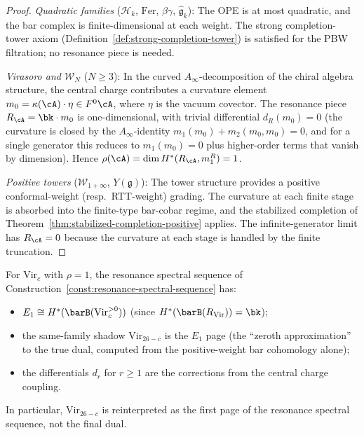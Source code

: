 \begin{proof}
\emph{Quadratic families} ($\mathcal{H}_k$, $\mathrm{Fer}$,
$\beta\gamma$, $\widehat{\mathfrak{g}}_k$):
The OPE is at most quadratic, and the bar complex is
finite-dimensional at each weight.  The strong completion-tower
axiom (Definition~\ref{def:strong-completion-tower}) is
satisfied for the PBW filtration; no resonance piece is needed.

\emph{Virasoro and $\mathcal{W}_N$} ($N \ge 3$):
In the curved $A_\infty$-decomposition of the chiral algebra
structure, the central charge contributes a curvature element
$m_0 = \kappa(\cA) \cdot \eta \in F^0\cA$, where $\eta$ is
the vacuum covector.
The resonance piece $R_\cA = \bk \cdot m_0$ is
one-dimensional, with trivial differential $d_R(m_0) = 0$
(the curvature is closed by the $A_\infty$-identity
$m_1(m_0) + m_2(m_0, m_0) = 0$, and for a single generator
this reduces to $m_1(m_0) = 0$ plus higher-order terms that
vanish by dimension).  Hence $\rho(\cA)
= \dim H^*(R_\cA, m_1^R) = 1$.

\emph{Positive towers} ($\mathcal{W}_{1+\infty}$, $Y(\mathfrak{g})$):
The tower structure provides a positive conformal-weight (resp.\
RTT-weight) grading.  The curvature at each finite stage is
absorbed into the finite-type bar-cobar regime, and the
stabilized completion of
Theorem~\ref{thm:stabilized-completion-positive} applies.
The infinite-generator limit has $R_\cA = 0$ because the
curvature at each stage is handled by the finite truncation.
\end{proof}

\begin{corollary}
\label{cor:virasoro-resonance-ss}
For $\mathrm{Vir}_c$ with $\rho = 1$, the resonance spectral
sequence of
Construction~\textup{\ref{const:resonance-spectral-sequence}}
has:
\begin{itemize}
\item $E_1 \cong H^*(\barB(\mathrm{Vir}_c^{>0}))$
  \textup{(}since $H^*(\barB(R_{\mathrm{Vir}})) = \bk$\textup{)};
\item the same-family shadow $\mathrm{Vir}_{26-c}$ is the
  $E_1$ page \textup{(}the ``zeroth approximation'' to the true
  dual, computed from the positive-weight bar cohomology alone\textup{)};
\item the differentials $d_r$ for $r \ge 1$ are the corrections
  from the central charge coupling.
\end{itemize}
In particular, $\mathrm{Vir}_{26-c}$ is reinterpreted as the
first page of the resonance spectral sequence, not the final dual.
\end{corollary}


